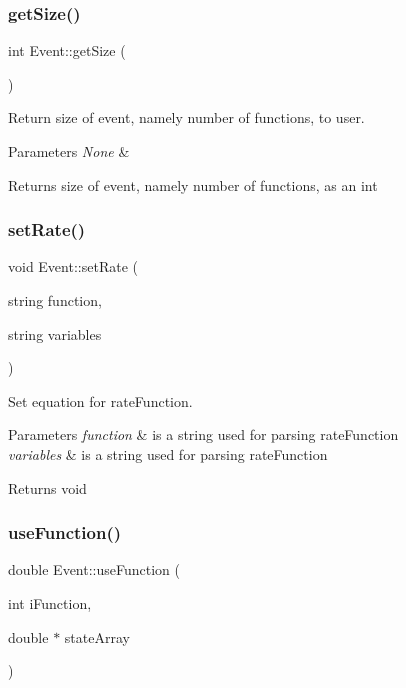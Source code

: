 \subsubsection{\texorpdfstring{get\+Size()}{getSize()}}
{\footnotesize\ttfamily int Event\+::get\+Size (\begin{DoxyParamCaption}{ }\end{DoxyParamCaption})}



Return size of event, namely number of functions, to user. 


\begin{DoxyParams}{Parameters}
{\em None} & \\
\hline
\end{DoxyParams}
\begin{DoxyReturn}{Returns}
size of event, namely number of functions, as an int 
\end{DoxyReturn}
\mbox{\label{class_event_a993a01984496bc158be92b67422f8655}} 
\subsubsection{\texorpdfstring{set\+Rate()}{setRate()}}
{\footnotesize\ttfamily void Event\+::set\+Rate (\begin{DoxyParamCaption}\item[{string}]{function,  }\item[{string}]{variables }\end{DoxyParamCaption})}



Set equation for rate\+Function. 


\begin{DoxyParams}{Parameters}
{\em function} & is a string used for parsing rate\+Function \\
\hline
{\em variables} & is a string used for parsing rate\+Function \\
\hline
\end{DoxyParams}
\begin{DoxyReturn}{Returns}
void 
\end{DoxyReturn}
\mbox{\label{class_event_a2637844b7f9583caf0f808c898dc2246}} 
\subsubsection{\texorpdfstring{use\+Function()}{useFunction()}}
{\footnotesize\ttfamily double Event\+::use\+Function (\begin{DoxyParamCaption}\item[{int}]{i\+Function,  }\item[{double $\ast$}]{state\+Array }\end{DoxyParamCaption})}



